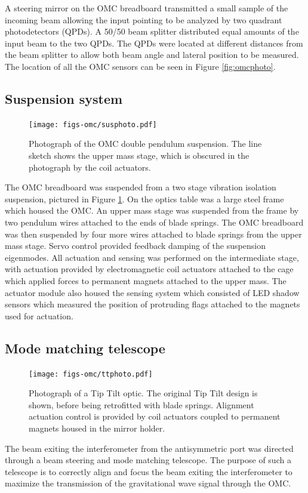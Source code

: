 A steering mirror on the OMC breadboard transmitted a small sample of the incoming beam allowing the input pointing to be analyzed by two quadrant photodetectors (QPDs). %
A 50/50 beam splitter distributed equal amounts of the input beam to the two QPDs. %
The QPDs were located at different distances from the beam splitter to allow both beam angle and lateral position to be measured. %
The location of all the OMC sensors can be seen in Figure \ref{fig:omcphoto}.

\subsection{Suspension system}
\begin{figure}
  \begin{center}
  \leavevmode
  \texttt{[image: figs-omc/susphoto.pdf]}
  \end{center}
  \caption[Photograph of the OMC double pendulum suspension.]{Photograph of the OMC double pendulum suspension. The line sketch shows the upper mass stage, which is obscured in the photograph by the coil actuators.}
  \label{fig:susphoto}
\end{figure}

The OMC breadboard was suspended from a two stage vibration isolation suspension, pictured in Figure \ref{fig:susphoto}. %
On the optics table was a large steel frame which housed the OMC. %
An upper mass stage was suspended from the frame by two pendulum wires attached to the ends of blade springs. %
The OMC breadboard was then suspended by four more wires attached to blade springs from the upper mass stage. %
Servo control provided feedback damping of the suspension eigenmodes. %
All actuation and sensing was performed on the intermediate stage, with actuation provided by electromagnetic coil actuators attached to the cage which applied forces to permanent magnets attached to the upper mass. %
The actuator module also housed the sensing system which consisted of LED shadow sensors which measured the position of protruding flags attached to the magnets used for actuation.

\subsection{Mode matching telescope}
\begin{figure}
  \begin{center}
  \leavevmode
  \texttt{[image: figs-omc/ttphoto.pdf]}
  \end{center}
  \caption[Photograph of a Tip Tilt optic.]{Photograph of a Tip Tilt optic. The original Tip Tilt design is shown, before being retrofitted with blade springs. Alignment actuation control is provided by coil actuators coupled to permanent magnets housed in the mirror holder. }
  \label{fig:ttphoto}
\end{figure}
The beam exiting the interferometer from the antisymmetric port was directed through a beam steering and mode matching telescope. %
The purpose of such a telescope is to correctly align and focus the beam exiting the interferometer to maximize the transmission of the gravitational wave signal through the OMC.

